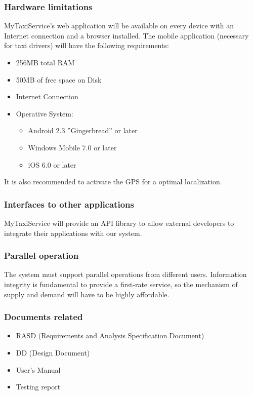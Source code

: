 \documentclass{article}
\begin{document}
		\subsubsection{Hardware limitations}
			MyTaxiService's web application will be available on every device with an Internet
			connection and a browser installed. The mobile application (necessary for taxi
			drivers) will have the following requirements:
			\begin{itemize}
				\item 256MB total RAM
				\item 50MB of free space on Disk
				\item Internet Connection
				\item Operative System:
					\begin{itemize}
						\item Android 2.3 ''Gingerbread'' or later
						\item Windows Mobile 7.0 or later
						\item iOS 6.0 or later
					\end{itemize} 
			\end{itemize}
			It is also recommended to activate the GPS for a optimal localization.
		\subsubsection{Interfaces to other applications}
			MyTaxiService will provide an API library to allow external developers to
			integrate their applications with our system.
		\subsubsection{Parallel operation}
			The system must support parallel operations from different users. Information
			integrity is fundamental to provide a first-rate service, so the mechanism of
			supply and demand will have to be highly affordable.
		\subsubsection{Documents related}
			\begin{itemize}
				\item RASD (Requirements and Analysis Specification Document)
				\item DD (Design Document)
				\item User's Manual
				\item Testing report
			\end{itemize}
\end{document}
